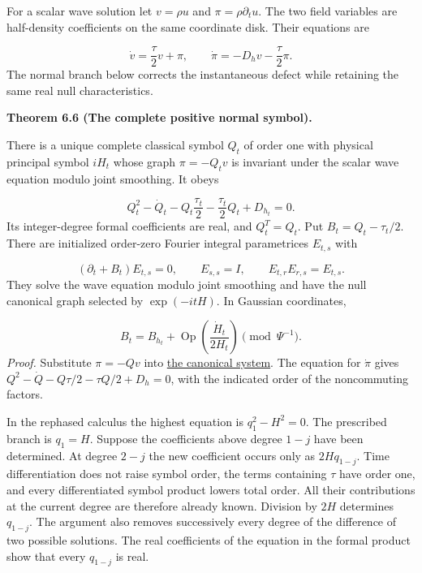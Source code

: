\documentclass[
  english,
  11pt,
  reqno]{amsart}
\makeatletter
\newcommand{\pandocstatementheading}[1]{%
  \par\addpenalty{\@beginparpenalty}%
  \addvspace{.5\baselineskip plus .2\baselineskip minus .2\baselineskip}%
  {\normalfont\bfseries #1\par}%
  \nobreak\@afterindenttrue\@afterheading
}
\makeatother
\begin{document}
For a scalar wave solution let \(v=\rho u\) and \(\pi=\rho\partial_tu\).
The two field variables are half-density coefficients on the same
coordinate disk. Their equations are

\label{eq:online-wave-canonical-cauchy-system} \[
\dot v=\frac{\tau}{2}v+\pi,
\qquad
\dot\pi=-D_hv-\frac{\tau}{2}\pi.
\] The normal branch below corrects the instantaneous defect while
retaining the same real null characteristics.

\pandocstatementheading{\leavevmode{}\label{thm:online-wave-normal-riccati}Theorem 6.6 (The complete positive normal symbol).}

There is a unique complete classical symbol \(Q_t\) of order one with
physical principal symbol \(iH_t\) whose graph \(\pi=-Q_tv\) is
invariant under the scalar wave equation modulo joint smoothing. It
obeys

\label{eq:online-wave-normal-riccati} \[
Q_t^2-\dot Q_t-Q_t\frac{\tau_t}{2}
-\frac{\tau_t}{2}Q_t+D_{h_t}=0.
\] Its integer-degree formal coefficients are real, and \(Q_t^T=Q_t\).
Put \(B_t=Q_t-\tau_t/2\). There are initialized order-zero Fourier
integral parametrices \(E_{t,s}\) with

\label{eq:online-wave-positive-propagator} \[
(\partial_t+B_t)E_{t,s}=0,\qquad E_{s,s}=I,
\qquad E_{t,r}E_{r,s}=E_{t,s}.
\] They solve the wave equation modulo joint smoothing and have the null
canonical graph selected by \(\exp(-itH)\). In Gaussian coordinates,

\label{eq:online-wave-corrected-generator} \[
B_t=B_{h_t}
+\operatorname{Op}\!\left(\frac{\dot H_t}{2H_t}\right)
\pmod{\Psi^{-1}}.
\] \emph{Proof.} Substitute \(\pi=-Qv\) into
\hyperref[eq:online-wave-canonical-cauchy-system]{the canonical system}.
The equation for \(\dot\pi\) gives
\(Q^2-\dot Q-Q\tau/2-\tau Q/2+D_h=0\), with the indicated order of the
noncommuting factors.

In the rephased calculus the highest equation is \(q_1^2-H^2=0\). The
prescribed branch is \(q_1=H\). Suppose the coefficients above degree
\(1-j\) have been determined. At degree \(2-j\) the new coefficient
occurs only as \(2Hq_{1-j}\). Time differentiation does not raise symbol
order, the terms containing \(\tau\) have order one, and every
differentiated symbol product lowers total order. All their
contributions at the current degree are therefore already known.
Division by \(2H\) determines \(q_{1-j}\). The argument also removes
successively every degree of the difference of two possible solutions.
The real coefficients of the equation in the formal product show that
every \(q_{1-j}\) is real.
\end{document}
